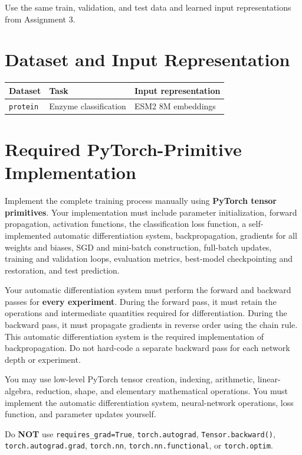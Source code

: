 \documentclass[11pt,a4paper]{article}
\newcommand{\code}[1]{\texttt{#1}}
\begin{document}
Use the same train, validation, and test data and learned input representations from Assignment 3.

\section{Dataset and Input Representation}

\begin{center}
\begin{tabular}{p{} p{} p{}}
\toprule
\textbf{Dataset} & \textbf{Task} & \textbf{Input representation} \\
\midrule
\code{protein} & Enzyme classification & ESM2 8M embeddings \\
\bottomrule
\end{tabular}
\end{center}

\section{Required PyTorch-Primitive Implementation}

Implement the complete training process manually using \textbf{PyTorch tensor primitives}. Your implementation must include parameter initialization, forward propagation, activation functions, the classification loss function, a self-implemented automatic differentiation system, backpropagation, gradients for all weights and biases, SGD and mini-batch construction, full-batch updates, training and validation loops, evaluation metrics, best-model checkpointing and restoration, and test prediction.

Your automatic differentiation system must perform the forward and backward passes for \textbf{every experiment}. During the forward pass, it must retain the operations and intermediate quantities required for differentiation. During the backward pass, it must propagate gradients in reverse order using the chain rule. This automatic differentiation system is the required implementation of backpropagation. Do not hard-code a separate backward pass for each network depth or experiment.

You may use low-level PyTorch tensor creation, indexing, arithmetic,
linear-algebra, reduction, shape, and elementary mathematical operations. You must implement the automatic differentiation system, neural-network operations, loss function, and parameter updates yourself.

Do \textbf{NOT} use \code{requires\_grad=True}, \code{torch.autograd},
\code{Tensor.backward()}, \code{torch.autograd.grad}, \code{torch.nn},
\code{torch.nn.functional}, or \code{torch.optim}.
\end{document}
